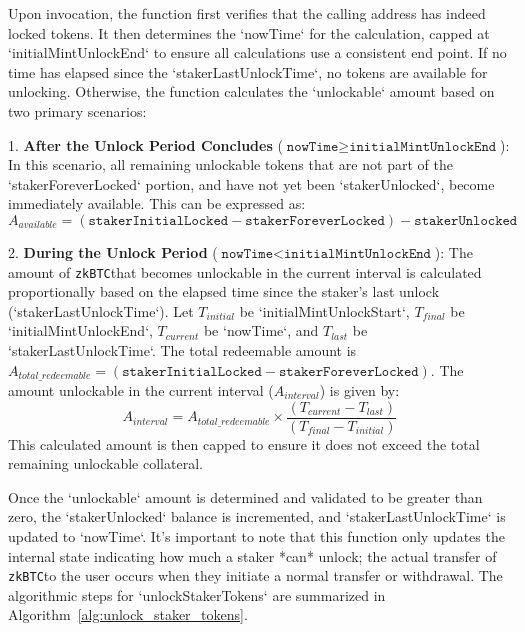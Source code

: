 \documentclass{DESSThesis}
\newcommand{\zktoken}{\texttt{zkBTC}}
\begin{document}
Upon invocation, the function first verifies that the calling address has indeed locked tokens. It then determines the `nowTime` for the calculation, capped at `initialMintUnlockEnd` to ensure all calculations use a consistent end point. If no time has elapsed since the `stakerLastUnlockTime`, no tokens are available for unlocking. Otherwise, the function calculates the `unlockable` amount based on two primary scenarios:

1.  \textbf{After the Unlock Period Concludes} ($\texttt{nowTime} \ge \texttt{initialMintUnlockEnd}$): In this scenario, all remaining unlockable tokens that are not part of the `stakerForeverLocked` portion, and have not yet been `stakerUnlocked`, become immediately available. This can be expressed as:
    \[
    A_{available} = (\texttt{stakerInitialLocked} - \texttt{stakerForeverLocked}) - \texttt{stakerUnlocked}
    \]

2. \textbf{During the Unlock Period} ($\texttt{nowTime} < \texttt{initialMintUnlockEnd}$): The amount of \zktoken that becomes unlockable in the current interval is calculated proportionally based on the elapsed time since the staker's last unlock (`stakerLastUnlockTime`). Let $T_{initial}$ be `initialMintUnlockStart`, $T_{final}$ be `initialMintUnlockEnd`, $T_{current}$ be `nowTime`, and $T_{last}$ be `stakerLastUnlockTime`. The total redeemable amount is $A_{total\_redeemable} = (\texttt{stakerInitialLocked} - \texttt{stakerForeverLocked})$. The amount unlockable in the current interval ($A_{interval}$) is given by:
    \begin{equation}
    A_{interval} = A_{total\_redeemable} \times \frac{(T_{current} - T_{last})}{(T_{final} - T_{initial})}
    \end{equation}
    This calculated amount is then capped to ensure it does not exceed the total remaining unlockable collateral.

Once the `unlockable` amount is determined and validated to be greater than zero, the `stakerUnlocked` balance is incremented, and `stakerLastUnlockTime` is updated to `nowTime`. It's important to note that this function only updates the internal state indicating how much a staker *can* unlock; the actual transfer of \zktoken to the user occurs when they initiate a normal transfer or withdrawal. The algorithmic steps for `unlockStakerTokens` are summarized in Algorithm~\ref{alg:unlock_staker_tokens}.
\end{document}

